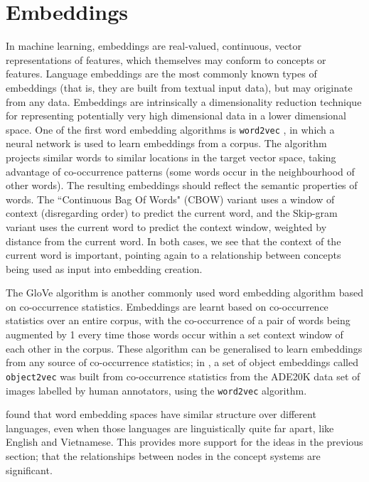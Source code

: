 \section{Embeddings}

In machine learning, embeddings are real-valued, continuous, vector representations of features, which themselves may conform to concepts or features. Language embeddings are the most commonly known types of embeddings (that is, they are built from textual input data), but may originate from any data. Embeddings are intrinsically a dimensionality reduction technique for representing potentially very high dimensional data in a lower dimensional space. One of the first word embedding algorithms is \texttt{word2vec} \cite{word2vec}, in which a neural network is used to learn embeddings from a corpus. The algorithm projects similar words to similar locations in the target vector space, taking advantage of co-occurrence patterns (some words occur in the neighbourhood of other words). The resulting embeddings should reflect the semantic properties of words. The ``Continuous Bag Of Words" (CBOW) variant uses a window of context (disregarding order) to predict the current word, and the Skip-gram variant uses the current word to predict the context window, weighted by distance from the current word. In both cases, we see that the context of the current word is important, pointing again to a relationship between concepts being used as input into embedding creation. 

The GloVe \cite{pennington2014glove} algorithm is another commonly used word embedding algorithm based on co-occurrence statistics. Embeddings are learnt based on co-occurrence statistics over an entire corpus, with the co-occurrence of a pair of words being augmented by 1 every time those words occur within a set context window of each other in the corpus. These algorithm can be generalised to learn embeddings from any source of co-occurrence statistics; in \cite{CoocurrenceVisionLanguage2021}, a set of object embeddings called \texttt{object2vec} was built from co-occurrence statistics from the ADE20K data set  of images labelled by human annotators, using the \texttt{word2vec} algorithm. 

\cite{MikolovMachineTranslation} found that word embedding spaces have similar structure over different languages, even when those languages are linguistically quite far apart, like English and Vietnamese. This provides more support for the ideas in the previous section; that the relationships between nodes in the concept systems are significant. 

